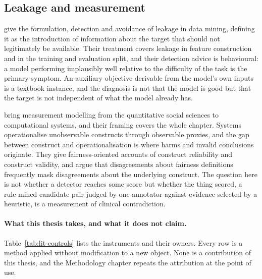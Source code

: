 \subsection{Leakage and measurement}

\citet{kaufman2012leakage} give the formulation, detection and avoidance of leakage in data
mining, defining it as the introduction of information about the target that should not
legitimately be available. Their treatment covers leakage in feature construction and in the
training and evaluation split, and their detection advice is behavioural: a model performing
implausibly well relative to the difficulty of the task is the primary symptom. An auxiliary
objective derivable from the model's own inputs is a textbook instance, and the diagnosis is
not that the model is good but that the target is not independent of what the model already
has.

\citet{jacobs2021measurement} bring measurement modelling from the quantitative social
sciences to computational systems, and their framing covers the whole chapter. Systems
operationalise unobservable constructs through observable proxies, and the gap between
construct and operationalisation is where harms and invalid conclusions originate. They give
fairness-oriented accounts of construct reliability and construct validity, and argue that
disagreements about fairness definitions frequently mask disagreements about the underlying
construct. The question here is not whether a detector reaches some score but whether the
thing scored, a rule-mined candidate pair judged by one annotator against evidence selected
by a heuristic, is a measurement of clinical contradiction.

\paragraph{What this thesis takes, and what it does not claim.}
Table~\ref{tab:lit-controls} lists the instruments and their owners. Every row is a method
applied without modification to a new object. None is a contribution of this thesis, and the
Methodology chapter repeats the attribution at the point of use.

